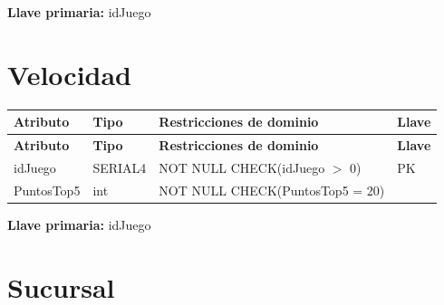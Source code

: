 \documentclass[12pt]{article}
\begin{document}
\vspace{2pt}
\textbf{Llave primaria:} idJuego\\

\section*{Velocidad}

\begin{longtable}{p{3.5cm} p{2.5cm} p{7.5cm} p{1.5cm}}
\label{tab:velocidad}\\
\toprule
\textbf{Atributo} & \textbf{Tipo} & \textbf{Restricciones de dominio} & \textbf{Llave} \\
\midrule
\endfirsthead

\toprule
\textbf{Atributo} & \textbf{Tipo} & \textbf{Restricciones de dominio} & \textbf{Llave} \\
\midrule
\endhead

\bottomrule
\endfoot

idJuego 
& SERIAL4
& NOT NULL \newline CHECK(idJuego $>$ 0)
& PK \\

PuntosTop5 
& int
& NOT NULL \newline CHECK(PuntosTop5 = 20)
& \\

\end{longtable}

\vspace{2pt}
\textbf{Llave primaria:} idJuego\\

\section*{Sucursal}
\end{document}
